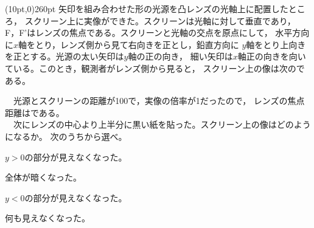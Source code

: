 \hakosyokika
\item
    \begin{mawarikomi}(10pt,0){260pt}{}
    矢印を組み合わせた形の光源を凸レンズの光軸上に配置したところ，
    スクリーン上に実像ができた。スクリーンは光軸に対して垂直であり，
    F，F'はレンズの焦点である。スクリーンと光軸の交点を原点にして，
    水平方向に$x$軸をとり，レンズ側から見て右向きを正とし，鉛直方向に
    $y$軸をとり上向きを正とする。光源の太い矢印は$y$軸の正の向き，
    細い矢印は$x$軸正の向きを向いている。このとき，観測者がレンズ側から見ると，
    スクリーン上の像は次の\Hako である。
    \end{mawarikomi}
    \begin{center}
        
    \end{center}
    　光源とスクリーンの距離が100で，実像の倍率が1だったので，
    レンズの焦点距離は\Hako {}である。\\
    　次にレンズの中心より上半分に黒い紙を貼った。スクリーン上の像はどのようになるか。
    次のうちから選べ。\Hako 
        \begin{edaenumerate}[m]
            \item $y>0$の部分が見えなくなった。
            \item 全体が暗くなった。
            \item $y<0$の部分が見えなくなった。
            \item 何も見えなくなった。
        \end{edaenumerate}

